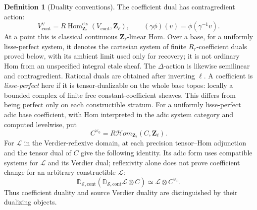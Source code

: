 \documentclass[11pt]{article}
\theoremstyle{definition}
\newtheorem{definition}[theorem]{Definition}
\theoremstyle{remark}
\begin{document}
\begin{definition}[Duality conventions]
The coefficient dual has contragredient action:
\begin{equation}
 V_{\mathrm{cont}}^\vee
 =R\operatorname{Hom}^{\mathrm{cts}}_{\mathbf Z_\ell}
       (V_{\mathrm{cont}},\mathbf Z_\ell),
 \qquad (\gamma\phi)(v)=\phi(\gamma^{-1}v).
 \label{eq:frag-continuous-contragredient}
\end{equation}
At a point this is classical continuous $\mathbf Z_\ell$-linear
Hom.  Over a base, for a uniformly lisse-perfect system, it denotes
the cartesian system of finite $R_r$-coefficient duals proved below,
with its ambient limit used only for recovery;
it is not ordinary Hom from an unspecified integral etale sheaf.
The $\Delta$-action is likewise semilinear and contragredient.
Rational duals are obtained after inverting $\ell$.
A coefficient is \emph{lisse-perfect} here if it is tensor-dualizable
on the whole base topos: locally a bounded complex of finite free
constant-coefficient sheaves.  This differs from being perfect only
on each constructible stratum.  For a uniformly lisse-perfect adic
base coefficient, with Hom interpreted in the adic system category
and computed levelwise, put
\begin{equation}
 C^{\vee_0}=R\mathcal Hom_{\mathbf Z_\ell}(C,\mathbf Z_\ell).
 \label{eq:frag-base-coefficient-dual}
\end{equation}
For $\mathcal L$ in the Verdier-reflexive domain, at each precision
tensor--Hom adjunction and the tensor dual of $C$ give the following
identity.  Its adic form uses compatible systems for $\mathcal L$
and its Verdier dual; reflexivity alone does not prove coefficient
change for an arbitrary constructible $\mathcal L$:
\begin{equation}
 \mathbb D_{\mathscr S,\mathrm{cont}}
 (\mathbb D_{\mathscr S,\mathrm{cont}}\mathcal L\otimes C)
 \simeq\mathcal L\otimes C^{\vee_0}.
 \label{eq:frag-base-duality-cancellation}
\end{equation}
Thus coefficient duality and source Verdier duality are distinguished
by their dualizing objects.
\end{definition}
\end{document}

